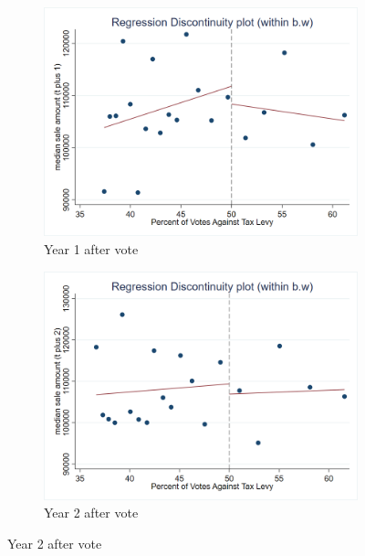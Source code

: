 \begin{figure}[ht]
    \centering
    \begin{minipage}[b]{0.48\textwidth}
        \centering
        \begin{subfigure}[b]{\textwidth}
            \centering
            \includegraphics[width=\textwidth,keepaspectratio]{images/rd_plot_median_sale_amount_t_plus_1_tri_mserd_1_2_within.png}
            \caption{Year 1 after vote}
            \label{fig:hp_year1_after}
        \end{subfigure}
    \end{minipage}
    \hfill
    \begin{minipage}[b]{0.48\textwidth}
        \centering
        \begin{subfigure}[b]{\textwidth}
            \centering
            \includegraphics[width=\textwidth,keepaspectratio]{images/rd_plot_median_sale_amount_t_plus_2_tri_mserd_1_2_within.png}
            \caption{Year 2 after vote}
            \label{fig:hp_year2_after}
        \end{subfigure}
    \end{minipage}


\end{figure}

